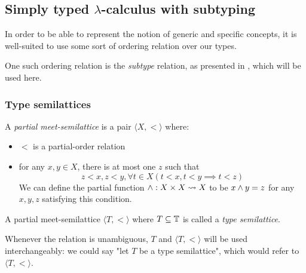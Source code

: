 \documentclass[main.tex]{subfiles}
\begin{document}
\subsection{Simply typed $\lambda$-calculus with subtyping}
\label{sec:lambda}

In order to be able to represent the notion of generic and specific concepts,
it is well-suited to use some sort of ordering relation over our types.

One such ordering relation is the \emph{subtype} relation, as presented in
\cite[chap.~15]{pierce}, which will be used here.


\subsubsection{Type semilattices}
\begin{defn}
    A \emph{partial meet-semilattice} is a pair $\langle X, \less \rangle$ where:
    \begin{itemize}
        \item $\less$ is a partial-order relation
        \item for any $x, y \in X$, there is at most one $z$ such that
        \[  z \less x, z \less y,
            \forall t \in X (t \less x, t \less y \implies t \less z) \]
        We can define the partial function $\wedge : X \times X \leadsto X$ to
        be $x \wedge y = z$ for any $x, y, z$ satisfying this condition.
    \end{itemize}
\end{defn}

\begin{defn}
    A partial meet-semilattice $\langle T, \less \rangle$ where
    $T \subseteq \mathbb{T}$ is called a \emph{type semilattice}.

    Whenever the relation is unambiguous, $T$ and $\langle T, \less \rangle$
    will be used interchangeably: we could say "let $T$ be a
    type semilattice", which would refer to $\langle T, \less \rangle$.
\end{defn}
\end{document}
